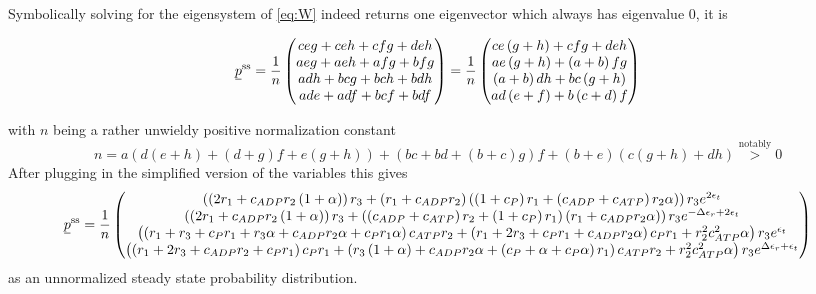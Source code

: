 \documentclass[11pt]{article}
\newcommand{\suf}[2]{\stackunder[0.5pt]{\stackunder[1pt]{\ensuremath{#1}}{\rule{\widthof{\ensuremath{#2}}*\real{0.9}}{.1ex}}}{}}
\newcommand{\su}[1]{\suf{#1}{#1}}
\begin{document}
Symbolically solving for the eigensystem of \cref{eq:W} indeed returns one eigenvector which always has eigenvalue 0, it is
\begin{tcolorbox}
    \begin{equation}
        \su{p}^\text{ss} = \frac{1}{n} \begin{pmatrix}
            c e g + c e h + c f g + d e h \\
            a e g + a e h + a f g + b f g \\
            a d h + b c g + b c h + b d h \\
            a d e + a d f + b c f + b d f
        \end{pmatrix} = \frac{1}{n} \begin{pmatrix}
            c e \left( g + h \right) + c f g + d e h \\
            a e \left( g + h \right) + \left( a + b \right) f g \\
            \left( a + b \right) d h + b c \left( g + h \right) \\
            a d \left( e + f \right) + b \left( c + d \right) f
        \end{pmatrix}
    \end{equation}
\end{tcolorbox}
with $n$ being a rather unwieldy positive normalization constant
\begin{equation}
    n = a \left( d \left( e + h \right) + \left( d + g \right) f + e \left( g + h \right) \right) + \left( b c + b d + \left( b + c \right) g \right) f + \left( b + e \right) \left( c \left( g + h \right) + d h \right) \overset{\text{notably}}{>} 0
\end{equation}
After plugging in the simplified version of the variables this gives
\footnotesize
\begin{equation}
    \su{p}^\text{ss} = \frac{1}{n} \begin{pmatrix}
        \left( \left( 2 r_1 + c_{ADP} r_2 \left( 1 + \alpha \right) \right) r_3 + \left( r_1 + c_{ADP} r_2 \right) \left( \left( 1 + c_P \right) r_1 + \left( c_{ADP} + c_{ATP} \right) r_2 \alpha \right) \right) r_3 e^{2 \epsilon_{t}} \\
        \left( \left( 2 r_1 + c_{ADP} r_2 \left( 1 + \alpha \right) \right) r_3 + \left( \left( c_{ADP} + c_{ATP} \right) r_2 + \left( 1 + c_P \right) r_1 \right) \left( r_1 + c_{ADP} r_2 \alpha \right) \right) r_3 e^{ - \Delta\epsilon_{r} + 2 \epsilon_{t}} \\
        \left( \left( r_1 + r_3 + c_P r_1 + r_3 \alpha + c_{ADP} r_2 \alpha + c_P r_1 \alpha \right) c_{ATP} r_2 + \left( r_1 + 2 r_3 + c_P r_1 + c_{ADP} r_2 \alpha \right) c_P r_1 + r_2^{2} c_{ATP}^{2} \alpha \right) r_3 e^{\epsilon_{t}} \\
        \left( \left( r_1 + 2 r_3 + c_{ADP} r_2 + c_P r_1 \right) c_P r_1 + \left( r_3 \left( 1 + \alpha \right) + c_{ADP} r_2 \alpha + \left( c_P + \alpha + c_P \alpha \right) r_1 \right) c_{ATP} r_2 + r_2^{2} c_{ATP}^{2} \alpha \right) r_3 e^{\Delta\epsilon_{r} + \epsilon_{t}}
    \end{pmatrix}\label{eq:pss_simp}
\end{equation}
\normalsize
as an unnormalized steady state probability distribution.
\end{document}
